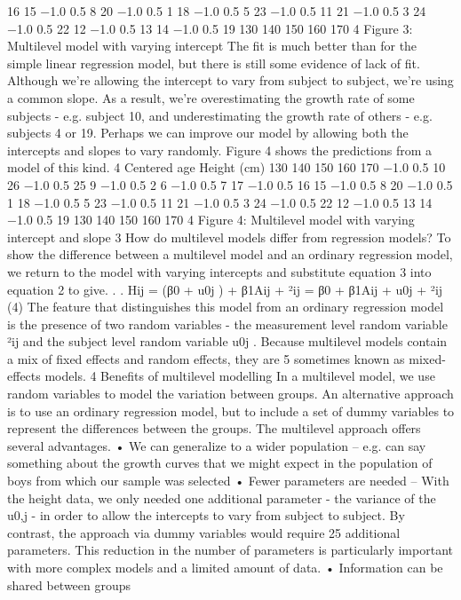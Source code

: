 16 15
−1.0 0.5
8 20
−1.0 0.5
1
18
−1.0 0.5
5 23
−1.0 0.5
11 21
−1.0 0.5
3 24
−1.0 0.5
22 12
−1.0 0.5
13 14
−1.0 0.5
19
130
140
150
160
170
4
Figure 3: Multilevel model with varying intercept
The fit is much better than for the simple linear regression model, but there is still some
evidence of lack of fit. Although we’re allowing the intercept to vary from subject to
subject, we’re using a common slope. As a result, we’re overestimating the growth rate
of some subjects - e.g. subject 10, and underestimating the growth rate of others - e.g.
subjects 4 or 19. Perhaps we can improve our model by allowing both the intercepts and
slopes to vary randomly. Figure 4 shows the predictions from a model of this kind.
4
Centered age
Height (cm)
130
140
150
160
170
−1.0 0.5
10 26
−1.0 0.5
25 9
−1.0 0.5
2 6
−1.0 0.5
7 17
−1.0 0.5
16 15
−1.0 0.5
8 20
−1.0 0.5
1
18
−1.0 0.5
5 23
−1.0 0.5
11 21
−1.0 0.5
3 24
−1.0 0.5
22 12
−1.0 0.5
13 14
−1.0 0.5
19
130
140
150
160
170
4
Figure 4: Multilevel model with varying intercept and slope
3 How do multilevel models differ from regression
models?
To show the difference between a multilevel model and an ordinary regression model, we
return to the model with varying intercepts and substitute equation 3 into equation 2 to
give. . .
Hij = (β0 + u0j ) + β1Aij + ²ij = β0 + β1Aij + u0j + ²ij (4)
The feature that distinguishes this model from an ordinary regression model is the presence
of two random variables - the measurement level random variable ²ij and the subject level
random variable u0j
.
Because multilevel models contain a mix of fixed effects and random effects, they are
5
sometimes known as mixed-effects models.
4 Benefits of multilevel modelling
In a multilevel model, we use random variables to model the variation between groups. An
alternative approach is to use an ordinary regression model, but to include a set of dummy
variables to represent the differences between the groups. The multilevel approach offers
several advantages.
• We can generalize to a wider population
– e.g. can say something about the growth curves that we might expect in the
population of boys from which our sample was selected
• Fewer parameters are needed
– With the height data, we only needed one additional parameter - the variance
of the u0,j - in order to allow the intercepts to vary from subject to subject. By
contrast, the approach via dummy variables would require 25 additional parameters.
This reduction in the number of parameters is particularly important
with more complex models and a limited amount of data.
• Information can be shared between groups
